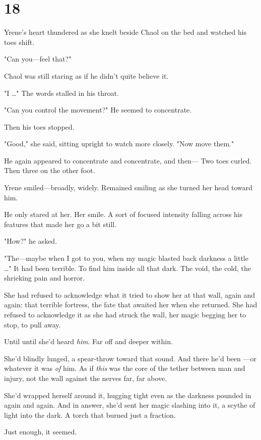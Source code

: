 
\chapter{18}

Yrene's heart thundered as she knelt beside Chaol on the bed and watched his toes shift.

"Can you---feel that?"

Chaol was still staring as if he didn't quite believe it.

"I \ldots" The words stalled in his throat.

"Can you control the movement?" He seemed to concentrate.

Then his toes stopped.

"Good," she said, sitting upright to watch more closely. "Now move them."

He again appeared to concentrate and concentrate, and then--- Two toes curled. Then three on the other foot.

Yrene smiled---broadly, widely. Remained smiling as she turned her head toward him.

He only stared at her. Her smile. A sort of focused intensity falling across his features that made her go a bit still.

"How?" he asked.

"The---maybe when I got to you, when my magic blasted back darkness a little \ldots" It had been terrible. To find him inside all that dark. The void, the cold, the shrieking pain and horror.

She had refused to acknowledge what it tried to show her at that wall, again and again: that terrible fortress, the fate that awaited her when she returned. She had refused to acknowledge it as she had struck the wall, her magic begging her to stop, to pull away.

Until  until she'd heard \emph{him}. Far off and deeper within.

She'd blindly lunged, a spear-throw toward that sound. And there he'd been ---or whatever it was \emph{of} him. As if \emph{this} was the core of the tether between man and injury, not the wall against the nerves far, far above.

She'd wrapped herself around it, hugging tight even as the darkness pounded in again and again. And in answer, she'd sent her magic slashing into it, a scythe of light into the dark. A torch that burned just a fraction.

Just enough, it seemed.

